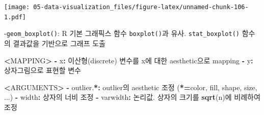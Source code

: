 \documentclass[
  11pt,
]{krantz}
\newenvironment{Shaded}{\begin{snugshade}}{\end{snugshade}}
\newcommand{\ErrorTok}[1]{\textcolor[rgb]{0.14,0.14,0.14}{\textbf{#1}}}
\newcommand{\KeywordTok}[1]{\textcolor[rgb]{0.27,0.27,0.27}{\textbf{#1}}}
\newcommand{\NormalTok}[1]{#1}
\newcommand{\OperatorTok}[1]{\textcolor[rgb]{0.43,0.43,0.43}{\textbf{#1}}}
\newcommand{\StringTok}[1]{\textcolor[rgb]{0.5,0.5,0.5}{#1}}
\begin{document}
\normalsize

\footnotesize

\texttt{[image: 05-data-visualization\_files/figure-latex/unnamed-chunk-106-1.pdf]}

\normalsize

-\texttt{geom\_boxplot()}: R 기본 그래픽스 함수 \texttt{boxplot()}과 유사. \texttt{stat\_boxplot()} 함수의 결과값을 기반으로 그래프 도출

\footnotesize

\begin{Shaded}
\begin{Highlighting}[]
\OperatorTok{<}\NormalTok{MAPPING}\OperatorTok{>}
\StringTok{  }\OperatorTok{-}\StringTok{ }\NormalTok{x}\OperatorTok{:}\StringTok{ }\NormalTok{이산형(discrete) 변수를 x에 대한 aesthetic으로 mapping}
  \OperatorTok{-}\StringTok{ }\NormalTok{y}\OperatorTok{:}\StringTok{ }\NormalTok{상자그림으로 표현할 변수}

\OperatorTok{<}\NormalTok{ARGUMENTS}\OperatorTok{>}
\StringTok{  }\OperatorTok{-}\StringTok{ }\NormalTok{outlier.}\OperatorTok{*}\ErrorTok{:}\StringTok{ }\NormalTok{outlier의 aesthetic 조정 (}\OperatorTok{*}\ErrorTok{=}\NormalTok{color, fill, shape, size, ...)}
  \OperatorTok{-}\StringTok{ }\NormalTok{width}\OperatorTok{:}\StringTok{ }\NormalTok{상자의 너비 조정}
  \OperatorTok{-}\StringTok{ }\NormalTok{varwidth}\OperatorTok{:}\StringTok{ }\NormalTok{논리값. 상자의 크기를 }\KeywordTok{sqrt}\NormalTok{(n)에 비례하여 조정}
\end{Highlighting}
\end{Shaded}

\normalsize

\footnotesize
\end{document}
